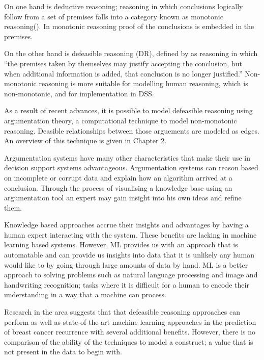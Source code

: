 On one hand is deductive reasoning; reasoning in which conclusions logically follow from a set of premises falls into a category known as monotonic reasoning(\cite{baroni1997full}). In monotonic reasoning proof of the conclusions is embedded in the premises.

On the other hand is defeasible reasoning (DR), defined by \cite{pollock1987defeasible} as reasoning in which ``the premises taken by themselves may justify accepting the conclusion, but when additional information is added, that conclusion is no longer justified.'' Non-monotonic reasoning is more suitable for modelling human reasoning, which is non-monotonic, and for implementation in DSS.

As a result of recent advances, it is possible to model defeasible reasoning using argumentation theory, a computational technique to model non-monotonic reasoning. Deasible relationships between those arguements are modeled as edges. An overview of this technique is given in Chapter 2.

Argumentation systems have many other characteristics that make their use in decision support systems advantageous. Argumentation systems can reason based on incomplete or corrupt data and explain how an algorithm arrived at a conclusion. Through the process of visualising a knowledge base using an argumentation tool an expert may gain insight into his own ideas and refine them. 

Knowledge based approaches accrue their insights and advantages by having a human expert interacting with the system. These benefits are lacking in machine learning based systems. However, ML provides us with an approach that is automatable and can provide us insights into data that it is unlikely any human would like to by going through large amounts of data by hand. ML is a better approach to solving problems such as natural language processing and image and handwriting recognition; tasks where it is difficult for a human to encode their understanding in a way that a machine can process.

Research in the area suggests that that defeasible reasoning approaches can perform as well as state-of-the-art machine learning approaches in the prediction of breast cancer recurrence with several additional benefits. However, there is no comparison of the ability of the techniques to model a construct; a value that is not present in the data to begin with.


